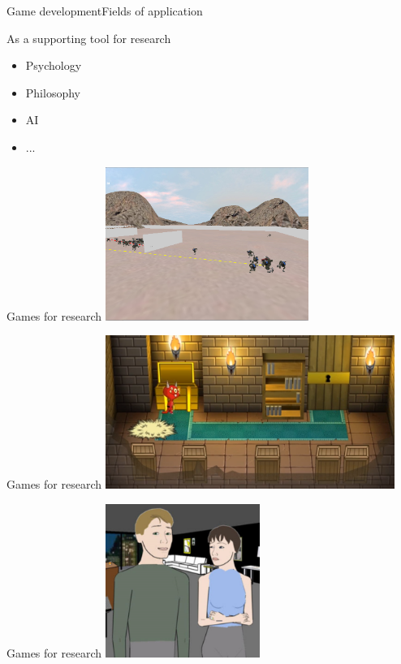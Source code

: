 \documentclass{beamer}
\begin{document}
\begin{slide}{Game development}{Fields of application}{
\item As a supporting tool for research
\begin{itemize}
\item Psychology \cite{GAMES_FOR_LANGUAGE_LEARNING}
\item Philosophy
\item AI \cite{GAMES_FOR_AI_RESEARCH}
\item ...
\end{itemize}
}\end{slide}

\begin{frame}{Games for research}
\center
\includegraphics[height=5cm]{Pics/game_for_ai.png}
\end{frame}

\begin{frame}{Games for research}
\center
\includegraphics[height=5cm]{Pics/game_for_philosophy.png}
\end{frame}

\begin{frame}{Games for research}
\center
\includegraphics[height=5cm]{Pics/game_for_psichology.png}
\end{frame}
\end{document}
